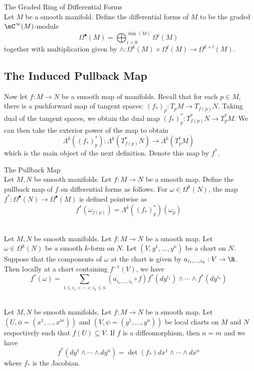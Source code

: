 \documentclass[a4paper]{article}
\begin{document}
\begin{defn}{The Graded Ring of Differential Forms}{}\\
Let $M$ be a smooth manifold. Define the differential forms of $M$ to be the graded $\mC^\infty(M)$-module $$\Omega^\bullet(M)=\bigoplus_{i=0}^{\dim(M)}\Omega^i(M)$$ together with multiplication given by $\wedge:\Omega^k(M)\times\Omega^l(M)\to\Omega^{k+l}(M)$. 
\end{defn}

\subsection{The Induced Pullback Map}
Now let $f:M\to N$ be a smooth map of manifolds. Recall that for each $p\in M$, there is a pushforward map of tangent spaces: $(f_\ast)_p:T_pM\to T_{f(p)}N$. Taking dual of the tangent spaces, we obtain the dual map $(f_\ast)_p^\ast:T_{f(p)}^\ast N\to T_p^\ast M$. We can then take the exterior power of the map to obtain $$\Lambda^k((f_\ast)_p^\ast):\Lambda^k(T_{f(p)}^\ast N)\to\Lambda^k(T_p^\ast M)$$ which is the main object of the next definition. Denote this map by $f^\ast$. 

\begin{defn}{The Pullback Map}{}\\
Let $M,N$ be smooth manifolds. Let $f:M\to N$ be a smooth map. Define the pullback map of $f$ on differential forms as follows. For $\omega\in\Omega^k(N)$, the map $f^\ast:\Omega^\bullet(N)\to\Omega^\bullet(M)$ is defined pointwise as  $$f^\ast(\omega_{f(p)})=\Lambda^k((f_\ast)_p^\ast)(\omega_p)$$
\end{defn}

\begin{prp}{}{}\\
Let $M,N$ be smooth manifolds. Let $f:M\to N$ be a smooth map. Let $\omega\in\Omega^k(N)$ be a smooth $k$-form on $N$. Let $(V,y^1,\dots,y^n)$ be a chart on $N$. Suppose that the components of $\omega$ at the chart is given by $a_{i_1,\dots,i_k}:V\to\R$. Then locally at a chart containing $f^{-1}(V)$, we have $$f^\ast(\omega)=\sum_{1\leq i_1<\cdots<i_k\leq n}(a_{i_1,\dots,i_k}\circ f)f^\ast(dy^{i_1})\wedge\cdots\wedge f^\ast(dy^{i_k})$$
\end{prp}

\begin{prp}{}{}\\
Let $M,N$ be smooth manifolds. Let $f:M\to N$ be a smooth map. Let $(U,\phi=(x^1,\dots,x^m))$ and $(V,\psi=(y^1,\dots,y^n))$ be local charts on $M$ and $N$ respectively such that $f(U)\subseteq V$. If $f$ is a diffeomorphism, then $n=m$ and we have $$f^\ast(dy^1\wedge\cdots\wedge dy^n)=\det\left(f_\ast\right)dx^1\wedge\cdots\wedge dx^n$$ where $f_\ast$ is the Jacobian. 
\end{prp}
\end{document}

